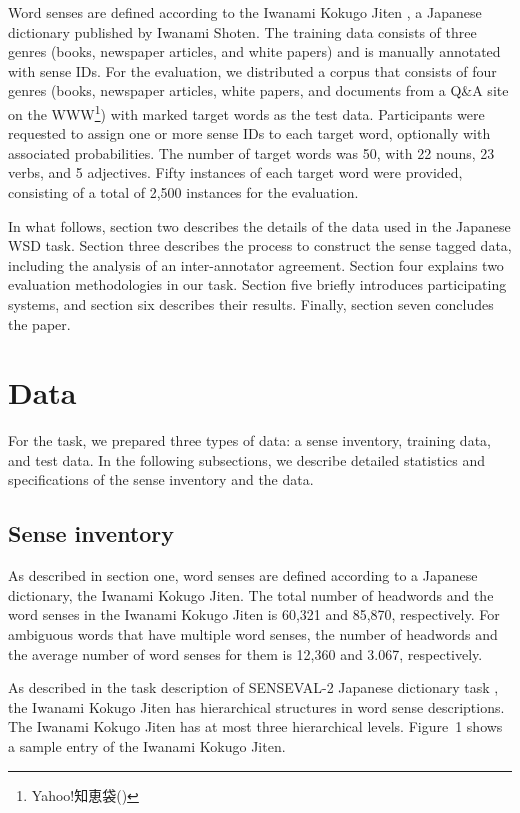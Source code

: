 \documentclass[english]{jnlp_1.4}
\newcommand{\url}[1]{}
\begin{document}
Word senses are defined according to the Iwanami Kokugo 
Jiten \cite{nishio:94:a}, a Japanese dictionary published by Iwanami
Shoten.
The training data consists of three genres (books, newspaper
articles, and white papers) and is manually annotated with sense IDs.
For the evaluation, we distributed a
corpus that consists of four genres (books, newspaper articles, white
papers, and documents from a Q\&A site on the
WWW\footnote{Yahoo!知恵袋(\url{http://chiebukuro.yahoo.co.jp/})}) with marked target
words as the test data. Participants were requested to assign one or more
sense IDs to each target word, optionally with associated
probabilities. The number of target words was 50, with 22 nouns, 23 verbs,
and 5 adjectives. Fifty instances of each target word were provided,
consisting of a total of 2,500 instances for the evaluation.

In what follows, section two describes the details of the data used in
the Japanese WSD task. Section three describes the process to
construct the sense tagged data, including the analysis of an
inter-annotator agreement. Section four explains two
evaluation methodologies in our task. Section five briefly introduces
participating systems, and section six describes their
results. Finally, section seven concludes the paper.



\section{Data}

For the task, we prepared three types of data: a sense
  inventory, training data, and test data. In the following
  subsections, we describe detailed statistics and specifications of
  the sense inventory and the data.


\subsection{Sense inventory}

As described in section one, word senses are defined according to a
Japanese dictionary, the Iwanami Kokugo Jiten. The total number of
headwords and the word senses in the Iwanami Kokugo Jiten is 60,321 and
85,870, respectively. For ambiguous words that have multiple
word senses, the number of headwords and the average number of word
senses for them is 12,360 and 3.067, respectively.

As described in the task description of SENSEVAL-2 Japanese
dictionary task \cite{shirai:01:a}, the Iwanami Kokugo Jiten has
hierarchical structures in word sense descriptions. The Iwanami Kokugo
Jiten has at most three hierarchical
levels. Figure~1 shows a sample entry of the Iwanami Kokugo Jiten.
\end{document}
